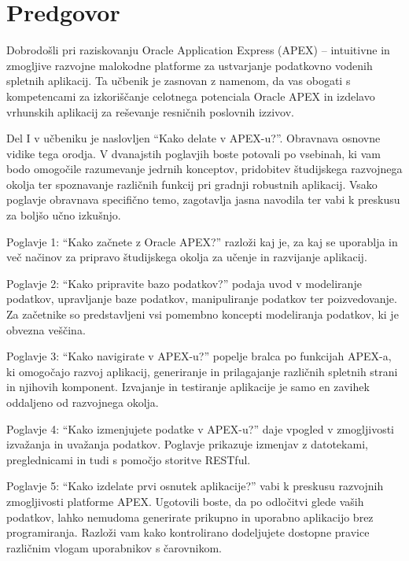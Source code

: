 \chapter*{Predgovor}


\vspace{1cm}
\indent Dobrodošli pri raziskovanju Oracle Application Express (APEX) – intuitivne in zmogljive razvojne malokodne platforme za ustvarjanje podatkovno vodenih spletnih aplikacij. Ta učbenik je zasnovan z namenom, da vas obogati s kompetencami za izkoriščanje celotnega potenciala Oracle APEX in izdelavo vrhunskih aplikacij za reševanje resničnih poslovnih izzivov.
\vspace{0.5cm}

\noindent Del I v učbeniku je naslovljen ``Kako delate v APEX-u?''. Obravnava osnovne vidike tega orodja. V dvanajstih poglavjih boste potovali po vsebinah, ki vam bodo omogočile razumevanje jedrnih konceptov, pridobitev študijskega razvojnega okolja ter spoznavanje različnih funkcij pri gradnji robustnih aplikacij. Vsako poglavje obravnava specifično temo, zagotavlja jasna navodila ter vabi k preskusu za boljšo učno izkušnjo.

Poglavje 1: ``Kako začnete z Oracle APEX?'' razloži kaj je, za kaj se uporablja in več načinov za pripravo študijskega okolja za učenje in razvijanje aplikacij.

Poglavje 2: ``Kako pripravite bazo podatkov?'' podaja uvod v modeliranje podatkov, upravljanje baze podatkov, manipuliranje podatkov ter poizvedovanje. Za začetnike so predstavljeni vsi pomembno koncepti modeliranja podatkov, ki je obvezna veščina.

Poglavje 3: ``Kako navigirate v APEX-u?'' popelje bralca po funkcijah APEX-a, ki omogočajo razvoj aplikacij, generiranje in prilagajanje različnih spletnih strani in njihovih komponent. Izvajanje in testiranje aplikacije je samo en zavihek oddaljeno od razvojnega okolja.

Poglavje 4: ``Kako izmenjujete podatke v APEX-u?'' daje vpogled v zmogljivosti izvažanja in uvažanja podatkov. Poglavje prikazuje izmenjav z datotekami, preglednicami in tudi s pomočjo storitve RESTful. 

Poglavje 5: ``Kako izdelate prvi osnutek aplikacije?'' vabi k preskusu razvojnih zmogljivosti platforme APEX. Ugotovili boste, da po odločitvi glede vaših podatkov, lahko nemudoma generirate prikupno in uporabno aplikacijo brez programiranja. Razloži vam kako kontrolirano dodeljujete dostopne pravice različnim vlogam uporabnikov s čarovnikom.

